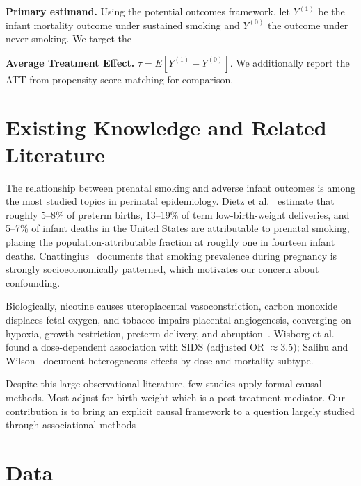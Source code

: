 \documentclass[11pt]{article}
\begin{document}
\textbf{Primary estimand.} Using the potential outcomes framework, let $Y^{(1)}$ be the infant mortality outcome under sustained smoking and $Y^{(0)}$ the outcome under never-smoking. We target the 

\textbf{Average Treatment Effect.} $\tau = E[Y^{(1)} - Y^{(0)}]$. We additionally report the ATT from propensity score matching for comparison.

\section{Existing Knowledge and Related Literature}

The relationship between prenatal smoking and adverse infant outcomes is among the most studied topics in perinatal epidemiology. Dietz et al.~\cite{dietz2010} estimate that roughly 5--8\% of preterm births, 13--19\% of term low-birth-weight deliveries, and 5--7\% of infant deaths in the United States are attributable to prenatal smoking, placing the population-attributable fraction at roughly one in fourteen infant deaths. Cnattingius~\cite{cnattingius2004} documents that smoking prevalence during pregnancy is strongly socioeconomically patterned, which motivates our concern about confounding.

Biologically, nicotine causes uteroplacental vasoconstriction, carbon monoxide displaces fetal oxygen, and tobacco impairs placental angiogenesis, converging on hypoxia, growth restriction, preterm delivery, and abruption~\cite{cnattingius2004}. Wisborg et al.~\cite{wisborg2000} found a dose-dependent association with SIDS (adjusted OR $\approx$3.5); Salihu and Wilson~\cite{salihu2007} document heterogeneous effects by dose and mortality subtype.

Despite this large observational literature, few studies apply formal causal methods. Most adjust for birth weight which is a post-treatment mediator. Our contribution is to bring an explicit causal framework to a question
largely studied through associational methods

\section{Data}
\end{document}
